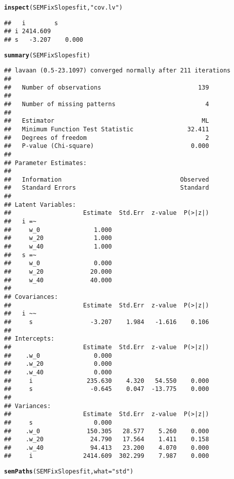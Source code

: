 \documentclass{article}\usepackage[]{graphicx}\usepackage[]{color}
\makeatletter
\newcommand{\hlstr}[1]{\textcolor[rgb]{0.192,0.494,0.8}{#1}}%
\newcommand{\hlstd}[1]{\textcolor[rgb]{0.345,0.345,0.345}{#1}}%
\newcommand{\hlkwc}[1]{\textcolor[rgb]{0.333,0.667,0.333}{#1}}%
\newcommand{\hlkwd}[1]{\textcolor[rgb]{0.737,0.353,0.396}{\textbf{#1}}}%
\newenvironment{kframe}{%
 \def\at@end@of@kframe{}%
 \ifinner\ifhmode%
  \def\at@end@of@kframe{\end{minipage}}%
  \begin{minipage}{\columnwidth}%
 \fi\fi%
 \def\FrameCommand##1{\hskip\@totalleftmargin \hskip-\fboxsep
 \colorbox{shadecolor}{##1}\hskip-\fboxsep
     \hskip-\linewidth \hskip-\@totalleftmargin \hskip\columnwidth}%
 \MakeFramed {\advance\hsize-\width
   \@totalleftmargin\z@ \linewidth\hsize
   \@setminipage}}%
 {\par\unskip\endMakeFramed%
 \at@end@of@kframe}
\newenvironment{knitrout}{}{} %
\makeatother
\begin{document}
\begin{knitrout}
\begin{kframe}
{\ttfamily\noindent{}}\begin{alltt}
\hlkwd{inspect}\hlstd{(SEMFixSlopesfit,} \hlstr{"cov.lv"}\hlstd{)}
\end{alltt}
\begin{verbatim}
##   i        s       
## i 2414.609         
## s   -3.207    0.000
\end{verbatim}
\begin{alltt}
\hlkwd{summary}\hlstd{(SEMFixSlopesfit)}
\end{alltt}
\begin{verbatim}
## lavaan (0.5-23.1097) converged normally after 211 iterations
## 
##   Number of observations                           139
## 
##   Number of missing patterns                         4
## 
##   Estimator                                         ML
##   Minimum Function Test Statistic               32.411
##   Degrees of freedom                                 2
##   P-value (Chi-square)                           0.000
## 
## Parameter Estimates:
## 
##   Information                                 Observed
##   Standard Errors                             Standard
## 
## Latent Variables:
##                    Estimate  Std.Err  z-value  P(>|z|)
##   i =~                                                
##     w_0               1.000                           
##     w_20              1.000                           
##     w_40              1.000                           
##   s =~                                                
##     w_0               0.000                           
##     w_20             20.000                           
##     w_40             40.000                           
## 
## Covariances:
##                    Estimate  Std.Err  z-value  P(>|z|)
##   i ~~                                                
##     s                -3.207    1.984   -1.616    0.106
## 
## Intercepts:
##                    Estimate  Std.Err  z-value  P(>|z|)
##    .w_0               0.000                           
##    .w_20              0.000                           
##    .w_40              0.000                           
##     i               235.630    4.320   54.550    0.000
##     s                -0.645    0.047  -13.775    0.000
## 
## Variances:
##                    Estimate  Std.Err  z-value  P(>|z|)
##     s                 0.000                           
##    .w_0             150.305   28.577    5.260    0.000
##    .w_20             24.790   17.564    1.411    0.158
##    .w_40             94.413   23.200    4.070    0.000
##     i              2414.609  302.299    7.987    0.000
\end{verbatim}
\begin{alltt}
\hlkwd{semPaths}\hlstd{(SEMFixSlopesfit,} \hlkwc{what} \hlstd{=} \hlstr{"std"}\hlstd{)}
\end{alltt}



\end{kframe}
\end{knitrout}
\end{document}
